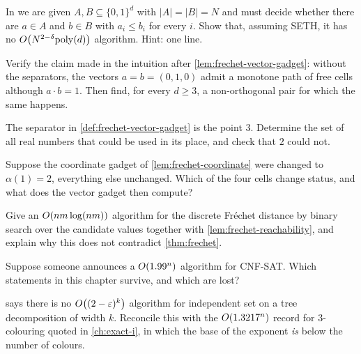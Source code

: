 \begin{exercise}
In  we are given $A, B \subseteq \{0,1\}^d$ with
$|A| = |B| = N$ and must decide whether there are $a \in A$ and $b \in B$ with
$a_i \le b_i$ for every $i$. Show that, assuming SETH, it has no
$O\!\left(N^{2-\delta}\mathrm{poly}(d)\right)$ algorithm. Hint: one line.
\end{exercise}

\begin{exercise}
Verify the claim made in the intuition after
\cref{lem:frechet-vector-gadget}: without the separators, the vectors
$a = b = (0,1,0)$ admit a monotone path of free cells although
$a \cdot b = 1$. Then find, for every $d \ge 3$, a non-orthogonal pair for
which the same happens.
\end{exercise}

\begin{exercise}
The separator in \cref{def:frechet-vector-gadget} is the point $3$. Determine
the set of all real numbers that could be used in its place, and check that
$2$ could not.
\end{exercise}

\begin{exercise}
Suppose the coordinate gadget of \cref{lem:frechet-coordinate} were changed to
$\alpha(1) = 2$, everything else unchanged. Which of the four cells change
status, and what does the vector gadget then compute?
\end{exercise}

\begin{exercise}
Give an $O\!\left(nm \log(nm)\right)$ algorithm for the discrete Fr\'echet distance by
binary search over the candidate values together with
\cref{lem:frechet-reachability}, and explain why this does not contradict
\cref{thm:frechet}.
\end{exercise}

\begin{exercise}
Suppose someone announces a $O\!\left(1.99^n\right)$ algorithm for CNF-SAT. Which
statements in this chapter survive, and which are lost?
\end{exercise}

\begin{exercise}
 says there is no $O\!\left((2-\varepsilon)^k\right)$
algorithm for independent set on a tree decomposition of width $k$. Reconcile
this with the $O\!\left(1.3217^n\right)$ record for $3$-colouring quoted in
\cref{ch:exact-i}, in which the base of the exponent \emph{is} below the number
of colours.
\end{exercise}
